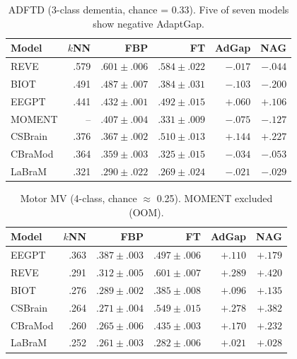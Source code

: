 \documentclass{article}
\begin{document}
\begin{table}[h]
  \caption{ADFTD (3-class dementia, chance = 0.33). Five of seven models show negative AdaptGap.}
  \centering\small
  \begin{tabular}{lrrrrr}
    \toprule
    Model & $k$NN & FBP & FT & AdGap & NAG \\
    \midrule
    REVE & .579 & $.601 \pm .006$ & $.584 \pm .022$ & $-.017$ & $-.044$ \\
    BIOT & .491 & $.487 \pm .007$ & $.384 \pm .031$ & $-.103$ & $-.200$ \\
    EEGPT & .441 & $.432 \pm .001$ & $.492 \pm .015$ & $+.060$ & $+.106$ \\
    MOMENT & -- & $.407 \pm .004$ & $.331 \pm .009$ & $-.075$ & $-.127$ \\
    CSBrain & .376 & $.367 \pm .002$ & $.510 \pm .013$ & $+.144$ & $+.227$ \\
    CBraMod & .364 & $.359 \pm .003$ & $.325 \pm .015$ & $-.034$ & $-.053$ \\
    LaBraM & .321 & $.290 \pm .022$ & $.269 \pm .024$ & $-.021$ & $-.029$ \\
    \bottomrule
  \end{tabular}
\end{table}

\begin{table}[h]
  \caption{Motor MV (4-class, chance $\approx$ 0.25). MOMENT excluded (OOM).}
  \centering\small
  \begin{tabular}{lrrrrr}
    \toprule
    Model & $k$NN & FBP & FT & AdGap & NAG \\
    \midrule
    EEGPT & .363 & $.387 \pm .003$ & $.497 \pm .006$ & $+.110$ & $+.179$ \\
    REVE & .291 & $.312 \pm .005$ & $.601 \pm .007$ & $+.289$ & $+.420$ \\
    BIOT & .276 & $.289 \pm .002$ & $.385 \pm .008$ & $+.096$ & $+.135$ \\
    CSBrain & .264 & $.271 \pm .004$ & $.549 \pm .015$ & $+.278$ & $+.382$ \\
    CBraMod & .260 & $.265 \pm .006$ & $.435 \pm .003$ & $+.170$ & $+.232$ \\
    LaBraM & .252 & $.261 \pm .003$ & $.282 \pm .006$ & $+.021$ & $+.028$ \\
    \bottomrule
  \end{tabular}
\end{table}
\end{document}
